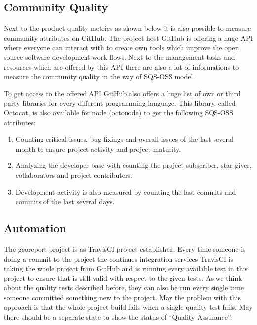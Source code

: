 \documentclass[DIV=calc,paper=a4,fontsize=9pt,twocolumn]{scrartcl}
\begin{document}
\subsection{Community Quality}

Next to the product quality metrics as shown below it is also possible to measure community attributes on GitHub. The project host GitHub is offering a huge API where everyone can interact with to create own tools which improve the open source software development work flows. Next to the management tasks and resources which are offered by this API there are also a lot of informations to measure the community quality in the way of SQS-OSS model. \citep{githubAPI2013}

To get access to the offered API GitHub also offers a huge list of own or third party libraries for every different programming language. This library, called Octocat, is also available for node (octonode) to get the following SQS-OSS attributes:

\begin{enumerate}
    \item Counting critical issues, bug fixings and overall issues of the last several month to ensure project activity and project maturity. 
    \item Analyzing the developer base with counting the project subscriber, star giver, collaborators and project contributers.
    \item Development activity is also measured by counting the last commits and commits of the last several days.
\end{enumerate}

\subsection{Automation}

The georeport project is as TravisCI project established. Every time someone is doing a commit to the project the continues integration services TravisCI is taking the whole project from GitHub and is running every available test in this project to ensure that is still valid with respect to the given tests. As we think about the quality tests described before, they can also be run every single time someone committed something new to the project. May the problem with this approach is that the whole project build fails when a single quality test fails. May there should be a separate state to show the status of \enquote{Quality Assurance}.
\end{document}
